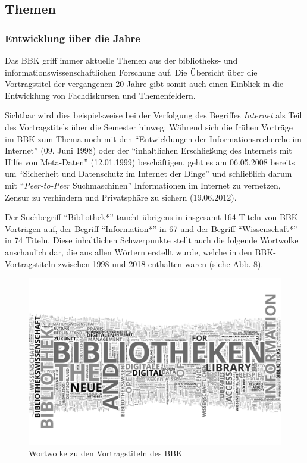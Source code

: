 \documentclass[a4paper,
fontsize=11pt,
oneside,
numbers=noperiodatend,
parskip=half-,
bibliography=totoc,
final
]{scrartcl}
\begin{document}
\hypertarget{themen}{%
\subsection{Themen}\label{themen}}

\hypertarget{entwicklung-uxfcber-die-jahre}{%
\subsubsection{Entwicklung über die
Jahre}\label{entwicklung-uxfcber-die-jahre}}

Das BBK griff immer aktuelle Themen aus der bibliotheks- und
informationswissenschaftlichen Forschung auf. Die Übersicht über die
Vortragstitel der vergangenen 20 Jahre gibt somit auch einen Einblick in
die Entwicklung von Fachdiskursen und Themenfeldern.

Sichtbar wird dies beispielsweise bei der Verfolgung des Begriffes
\emph{Internet} als Teil des Vortragstitels über die Semester hinweg:
Während sich die frühen Vorträge im BBK zum Thema noch mit den
\enquote{Entwicklungen der Informationsrecherche im Internet} (09. Juni
1998) oder der \enquote{inhaltlichen Erschließung des Internets mit
Hilfe von Meta-Daten} (12.01.1999) beschäftigen, geht es am 06.05.2008
bereits um \enquote{Sicherheit und Datenschutz im Internet der Dinge}
und schließlich darum mit \enquote{\emph{Peer-to-Peer} Suchmaschinen}
Informationen im Internet zu vernetzen, Zensur zu verhindern und
Privatsphäre zu sichern (19.06.2012).

Der Suchbegriff \enquote{Bibliothek*} taucht übrigens in insgesamt 164
Titeln von BBK-Vorträgen auf, der Begriff \enquote{Information*} in 67
und der Begriff \enquote{Wissenschaft*} in 74 Titeln. Diese inhaltlichen
Schwerpunkte stellt auch die folgende Wortwolke anschaulich dar, die aus
allen Wörtern erstellt wurde, welche in den BBK-Vortragstiteln zwischen
1998 und 2018 enthalten waren (siehe Abb. 8).

\begin{figure}[h!]
\centering
\includegraphics[width=15cm]{img/Abbildung8.png}
\caption{Wortwolke zu den Vortragstiteln des BBK}
\end{figure}
\end{document}
